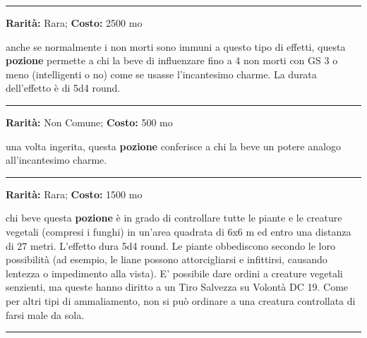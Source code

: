 \begin{multicols}{2}
\smallskip\noindent\rule{\linewidth}{2pt}  \hypertarget{PozionediControllodeinonmorti}{}\smallskip{}\noindent\label{PozionediControllodeinonmorti}

\textbf{Rarità:} Rara; \textbf{Costo:} 2500 mo

anche se normalmente i non morti sono immuni a questo tipo di effetti, questa \textbf{pozione} permette a chi la beve di influenzare fino a 4 non morti con GS 3 o meno (intelligenti o no) come se usasse l'incantesimo charme. La durata dell'effetto è di 5d4 round.

\smallskip\noindent\rule{\linewidth}{2pt}  \hypertarget{PozionediControllodellepersone}{}\smallskip{}\noindent\label{PozionediControllodellepersone}

\textbf{Rarità:} Non Comune; \textbf{Costo:} 500 mo

una volta ingerita, questa \textbf{pozione} conferisce a chi la beve un potere analogo all'incantesimo charme.

\smallskip\noindent\rule{\linewidth}{2pt}  \hypertarget{PozionediControllodellepiante}{}\smallskip{}\noindent\label{PozionediControllodellepiante}

\textbf{Rarità:} Rara; \textbf{Costo:} 1500 mo

chi beve questa \textbf{pozione} è in grado di controllare tutte le piante e le creature vegetali (compresi i funghi) in un'area quadrata di 6x6 m ed entro una distanza di 27 metri. L'effetto dura 5d4 round. Le piante obbediscono secondo le loro possibilità (ad esempio, le liane possono attorcigliarsi e infittirsi, causando lentezza o impedimento alla vista). E' possibile dare ordini a creature vegetali senzienti, ma queste hanno diritto a un Tiro Salvezza su Volontà DC 19. Come per altri tipi di ammaliamento, non si può ordinare a una creatura controllata di farsi male da sola.

\smallskip\noindent\rule{\linewidth}{2pt}  \hypertarget{PozionediCrescita}{}\smallskip{}\noindent\label{PozionediCrescita}


\end{multicols}
